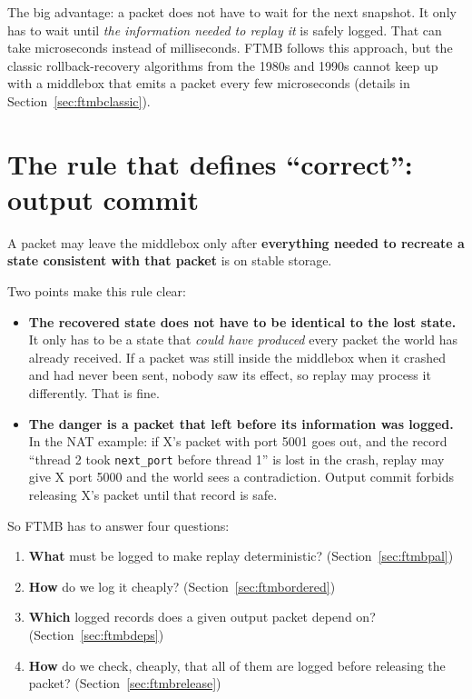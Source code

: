 The big advantage: a packet does not have to wait for the next snapshot. It only has to wait until \emph{the information needed to
replay it} is safely logged. That can take microseconds instead of milliseconds. FTMB follows this approach, but the classic
rollback-recovery algorithms from the 1980s and 1990s cannot keep up with a middlebox that emits a packet every few microseconds
(details in Section~\ref{sec:ftmbclassic}).

\section{The rule that defines ``correct'': output commit}

\begin{keybox}
A packet may leave the middlebox only after \textbf{everything needed to recreate a state consistent with that packet} is on
stable storage.
\end{keybox}

Two points make this rule clear:
\begin{itemize}
  \item \textbf{The recovered state does not have to be identical to the lost state.} It only has to be a state that \emph{could have
        produced} every packet the world has already received. If a packet was still inside the middlebox when it crashed and had
        never been sent, nobody saw its effect, so replay may process it differently. That is fine.
  \item \textbf{The danger is a packet that left before its information was logged.} In the NAT example: if X's packet with port 5001
        goes out, and the record ``thread 2 took \texttt{next\_port} before thread 1'' is lost in the crash, replay may give X port 5000
        and the world sees a contradiction. Output commit forbids releasing X's packet until that record is safe.
\end{itemize}

So FTMB has to answer four questions:
\begin{enumerate}
  \item \textbf{What} must be logged to make replay deterministic? (Section~\ref{sec:ftmbpal})
  \item \textbf{How} do we log it cheaply? (Section~\ref{sec:ftmbordered})
  \item \textbf{Which} logged records does a given output packet depend on? (Section~\ref{sec:ftmbdeps})
  \item \textbf{How} do we check, cheaply, that all of them are logged before releasing the packet? (Section~\ref{sec:ftmbrelease})
\end{enumerate}

